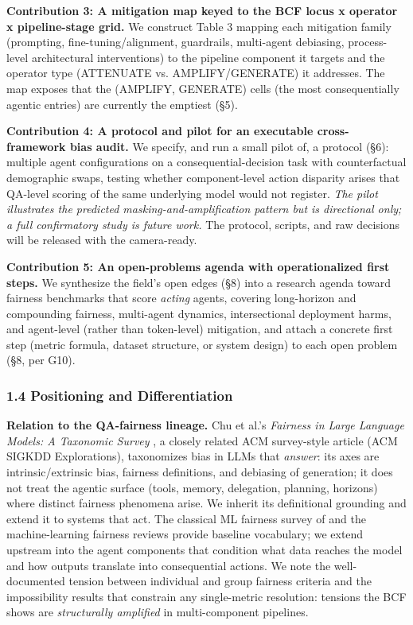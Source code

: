 \documentclass[10pt]{article}
\begin{document}
\textbf{Contribution 3: A mitigation map keyed to the BCF locus x operator x pipeline-stage grid.} We construct Table 3 mapping each mitigation family (prompting, fine-tuning/alignment, guardrails, multi-agent debiasing, process-level architectural interventions) to the pipeline component it targets and the operator type (ATTENUATE vs. AMPLIFY/GENERATE) it addresses. The map exposes that the (AMPLIFY, GENERATE) cells (the most consequentially agentic entries) are currently the emptiest (\S{}5).

\textbf{Contribution 4: A protocol and pilot for an executable cross-framework bias audit.} We specify, and run a small pilot of, a protocol (\S{}6): multiple agent configurations on a consequential-decision task with counterfactual demographic swaps, testing whether component-level action disparity arises that QA-level scoring of the same underlying model would not register. \emph{The pilot illustrates the predicted masking-and-amplification pattern but is directional only; a full confirmatory study is future work.} The protocol, scripts, and raw decisions will be released with the camera-ready.

\textbf{Contribution 5: An open-problems agenda with operationalized first steps.} We synthesize the field's open edges (\S{}8) into a research agenda toward fairness benchmarks that score \emph{acting} agents, covering long-horizon and compounding fairness, multi-agent dynamics, intersectional deployment harms, and agent-level (rather than token-level) mitigation, and attach a concrete first step (metric formula, dataset structure, or system design) to each open problem (\S{}8, per G10).

\subsubsection*{1.4 Positioning and Differentiation}

\textbf{Relation to the QA-fairness lineage.} Chu et al.'s \emph{Fairness in Large Language Models: A Taxonomic Survey} \cite{chu2024fairness}, a closely related ACM survey-style article (ACM SIGKDD Explorations), taxonomizes bias in LLMs that \emph{answer}: its axes are intrinsic/extrinsic bias, fairness definitions, and debiasing of generation; it does not treat the agentic surface (tools, memory, delegation, planning, horizons) where distinct fairness phenomena arise. We inherit its definitional grounding \cite{dwork2012fairness,hardt2016equality,kusner2017counterfactual,gallegos2024bias} and extend it to systems that act. The classical ML fairness survey of \cite{mehrabi2021survey} and the machine-learning fairness reviews \cite{pessach2022review,caton2024fairness} provide baseline vocabulary; we extend upstream into the agent components that condition what data reaches the model and how outputs translate into consequential actions. We note the well-documented tension between individual and group fairness criteria \cite{dwork2012fairness} and the impossibility results \cite{kleinberg2017inherent,chouldechova2017fair} that constrain any single-metric resolution: tensions the BCF shows are \emph{structurally amplified} in multi-component pipelines.
\end{document}
